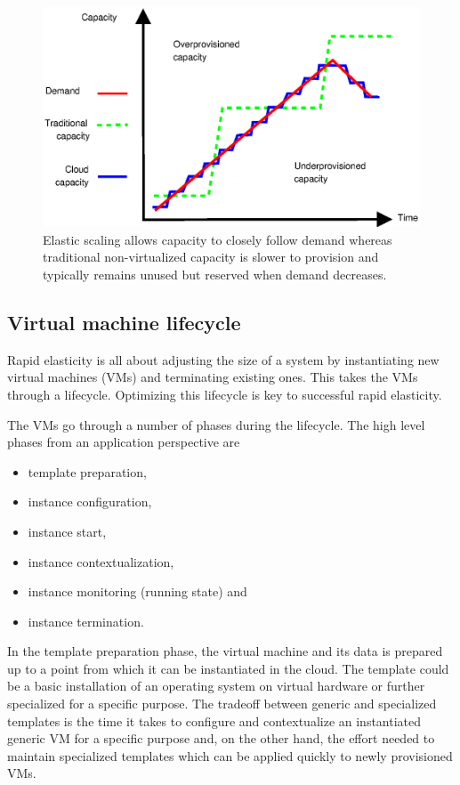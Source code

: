 \documentclass[english]{tktltiki2}
\theoremstyle{definition}
\theoremstyle{remark}
\begin{document}
\begin{figure}[h!]
	\includegraphics[width=\textwidth]{images/oldVsNewScaling}
	\caption{Elastic scaling allows capacity to closely follow demand whereas
	traditional non-virtualized capacity is slower to provision and typically
	remains unused but reserved when demand decreases.}
	\label{fig:oldVsNewScalability}
\end{figure}

\subsection{Virtual machine lifecycle} \label{sec:VMLifeCycle}

Rapid elasticity is all about adjusting the size of a system by instantiating
new virtual machines (VMs) and terminating existing ones. This takes the VMs
through a lifecycle. Optimizing this lifecycle is key to successful rapid
elasticity.

The VMs go through a number of phases during the lifecycle. The high level
phases from an application perspective are

\begin{itemize}
\item template preparation,
\item instance configuration,
\item instance start,
\item instance contextualization,
\item instance monitoring (running state) and 
\item instance termination.
\end{itemize}

In the template preparation phase, the virtual machine and its data is prepared
up to a point from which it can be instantiated in the cloud. The template could
be a basic installation of an operating system on virtual hardware or further
specialized for a specific purpose. The tradeoff between generic and specialized
templates is the time it takes to configure and contextualize an instantiated
generic VM for a specific purpose and, on the other hand, the
effort needed to maintain specialized templates which can be applied quickly to
newly provisioned VMs.
\end{document}
